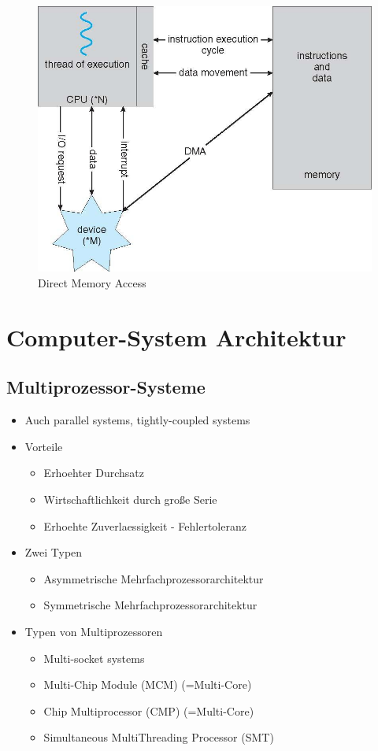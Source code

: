 \documentclass[a4paper]{scrreprt}
\begin{document}
\begin{figure}[ht]
\centering
\includegraphics[scale=0.4]{graphics/dma.png}
\caption{Direct Memory Access}
\end{figure}

\section{Computer-System Architektur}
\subsection{Multiprozessor-Systeme}
\begin{itemize}
	\item Auch parallel systems, tightly-coupled systems
	\item Vorteile
		\begin{itemize}
			\item Erhoehter Durchsatz
			\item Wirtschaftlichkeit durch große Serie
			\item Erhoehte Zuverlaessigkeit - Fehlertoleranz
		\end{itemize}
	\item Zwei Typen
		\begin{itemize}
			\item Asymmetrische Mehrfachprozessorarchitektur
			\item Symmetrische Mehrfachprozessorarchitektur
		\end{itemize}
	\item Typen von Multiprozessoren
		\begin{itemize}
			\item Multi-socket systems
			\item Multi-Chip Module (MCM) (=Multi-Core)
			\item Chip Multiprocessor (CMP) (=Multi-Core)
			\item Simultaneous MultiThreading Processor (SMT)
		\end{itemize}
\end{itemize}
\end{document}
